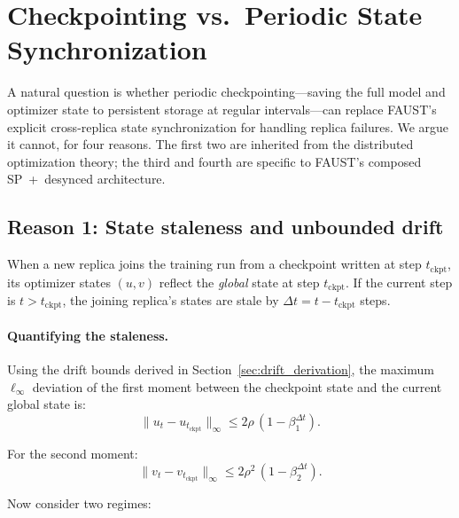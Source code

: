 \documentclass{article}
\begin{document}
\section{Checkpointing vs.\ Periodic State Synchronization}
\label{sec:checkpoint}

A natural question is whether periodic checkpointing---saving the full
model and optimizer state to persistent storage at regular intervals---can
replace FAUST's explicit cross-replica state synchronization for
handling replica failures. We argue it cannot, for four reasons. The first
two are inherited from the distributed optimization theory; the third and
fourth are specific to FAUST's composed SP~+~desynced architecture.

\subsection{Reason 1: State staleness and unbounded drift}
\label{sec:checkpoint_staleness}

When a new replica joins the training run from a checkpoint written at
step $t_{\text{ckpt}}$, its optimizer states $(u, v)$ reflect the
\emph{global} state at step $t_{\text{ckpt}}$. If the current step is
$t > t_{\text{ckpt}}$, the joining replica's states are stale by
$\Delta t = t - t_{\text{ckpt}}$ steps.

\paragraph{Quantifying the staleness.}
Using the drift bounds derived in Section~\ref{sec:drift_derivation},
the maximum $\ell_\infty$ deviation of the first moment between the
checkpoint state and the current global state is:
\begin{equation}
\|u_t - u_{t_{\text{ckpt}}}\|_\infty
\leq 2\rho\,(1 - \beta_1^{\Delta t}).
\label{eq:ckpt_drift_u}
\end{equation}

For the second moment:
\begin{equation}
\|v_t - v_{t_{\text{ckpt}}}\|_\infty
\leq 2\rho^2\,(1 - \beta_2^{\Delta t}).
\label{eq:ckpt_drift_v}
\end{equation}

Now consider two regimes:
\end{document}
